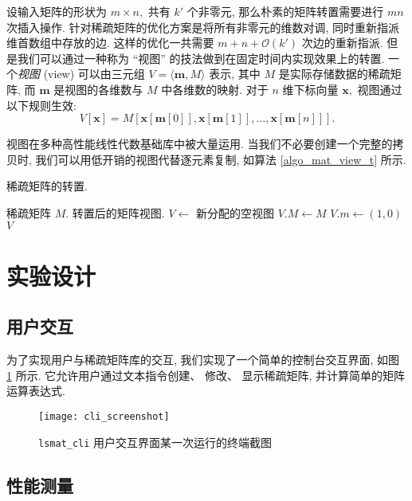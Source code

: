 设输入矩阵的形状为 $m \times n,$ 共有 $k'$ 个非零元, 那么朴素的矩阵转置需要进行 $mn$ 次插入操作. 针对稀疏矩阵的优化方案是将所有非零元的维数对调, 同时重新指派维首数组中存放的边. 这样的优化一共需要 $m + n + \mathcal{O}(k')$ 次边的重新指派. 但是我们可以通过一种称为 “视图” 的技法做到在固定时间内实现效果上的转置. 一个\textit{视图} (view) 可以由三元组 $V = \langle \bm{m}, M \rangle$ 表示, 其中 $M$ 是实际存储数据的稀疏矩阵, 而 $\bm{m}$ 是视图的各维数与 $M$ 中各维数的映射. 对于 $n$ 维下标向量 $\bm{x},$ 视图通过以下规则生效:
\begin{equation}
    V[\bm{x}] = M[\bm{x}[\bm{m}[0]], \bm{x}[\bm{m}[1]], \hdots, \bm{x}[\bm{m}[n]]].
\end{equation}

视图在多种高性能线性代数基础库中被大量运用\cite{bib_numpy}. 当我们不必要创建一个完整的拷贝时, 我们可以用低开销的视图代替逐元素复制, 如算法 \ref{algo_mat_view_t} 所示.
\begin{breakablealgorithm}
\caption{稀疏矩阵的转置.}
\label{algo_mat_view_t}
\begin{algorithmic}[1]
\Require 稀疏矩阵 $M.$
\Ensure 转置后的矩阵视图.
    \State $V \gets$ 新分配的空视图
    \State $V.M \gets M$
    \State $V.m \gets (1, 0)$
    \State \Return $V$
\EndFunction
\end{algorithmic}
\end{breakablealgorithm}

\section{实验设计}

\subsection{用户交互}

为了实现用户与稀疏矩阵库的交互, 我们实现了一个简单的控制台交互界面, 如图 \ref{fig_screenshot_cli} 所示. 它允许用户通过文本指令创建、 修改、 显示稀疏矩阵, 并计算简单的矩阵运算表达式.

\begin{figure}[H]
    \centering
    \texttt{[image: cli\_screenshot]}
    \caption{\texttt{lsmat\_cli} 用户交互界面某一次运行的终端截图}
    \label{fig_screenshot_cli}
\end{figure}

\subsection{性能测量}

